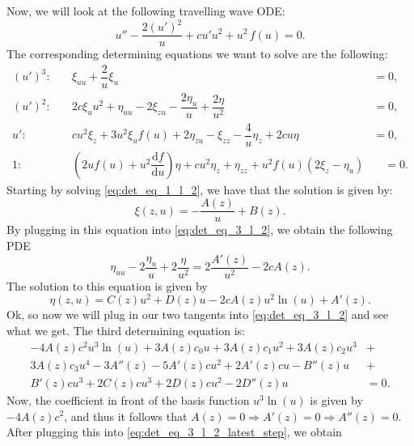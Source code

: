 Now, we will look at the following travelling wave ODE:
\begin{equation}
    u''-\dfrac{2(u')^2}{u}+cu'u^2+u^2\,f(u)=0.
\end{equation}
The corresponding determining equations we want to solve are the following:
\begin{align}
(u')^3:&\quad\xi_{uu}+\dfrac{2}{u}\xi_u&=0,\label{eq:det_eq_1_l_2}\\
(u')^2:&\quad2c\xi_u u^{2}+\eta_{uu}-2\xi_{zu}-\dfrac{2\eta_u}{u}+\dfrac{2\eta}{u^2}&=0,\label{eq:det_eq_2_l_2}\\
u':&\quad cu^{2}\xi_z+3u^{2}\xi_u f(u)+2\eta_{zu}-\xi_{zz}-\dfrac{4}{u}\eta_z+2c u\eta&=0,\label{eq:det_eq_3_l_2}\\
1:&\quad \left(2u f(u)+u^2\dfrac{\mathrm{d}f}{\mathrm{d}u}\right)\eta+cu^{2}\eta_z+\eta_{zz}+u^{2}f(u)(2\xi_z-\eta_u)&\quad=0.\label{eq:det_eq_4_l_2}
\end{align}
Starting by solving \eqref{eq:det_eq_1_l_2}, we have that the solution is given by:
\begin{equation}
  \xi{(z,u)}=-\dfrac{A(z)}{u}+B(z).
  \label{eq:xi_l_2}
\end{equation}
By plugging in this equation into \eqref{eq:det_eq_3_l_2}, we obtain the following PDE
\begin{equation}
  \eta_{uu}-2\dfrac{\eta_u}{u}+2\dfrac{\eta}{u^2}=2\dfrac{A'(z)}{u^2}-2cA(z).
  \label{eq:eta_l_2}
\end{equation}
The solution to this equation is given by
\begin{equation}
  \eta{(z,u)}=C(z)u^2 + D(z)u-2cA(z)u^{2}\ln{(u)}+A'(z).
  \label{eq:eta_l_2_sol}
\end{equation}
Ok, so now we will plug in our two tangents into \eqref{eq:det_eq_3_l_2} and see what we get. The third determining equation is:
\begin{equation}
  \begin{split}
    - 4 A(z) c^{2} u^{3} \ln{\left(u \right)} + 3 A(z) c_{0} u + 3 A(z) c_{1} u^{2} + 3 A(z) c_{2} u^{3} &+\\
    3 A(z) c_{3} u^{4} - 3 A''(z) - 5 A'(z) c u^{2} + 2 A'(z) c u - B''(z) u &+\\
    B'(z) c u^{3} + 2 C(z) c u^{3} + 2 D(z) c u^{2} - 2 D''(z) u&=0.
    \end{split}
\label{eq:det_eq_3_l_2_latest_step}
\end{equation}
Now, the coefficient in front of the basis function $u^{3} \ln{\left(u \right)}$ is given by $- 4 A(z) c^{2}$, and thus it follows that $A(z)=0\Longrightarrow A'(z)=0\Longrightarrow A''(z)=0$. After plugging this into \eqref{eq:det_eq_3_l_2_latest_step}, we obtain
